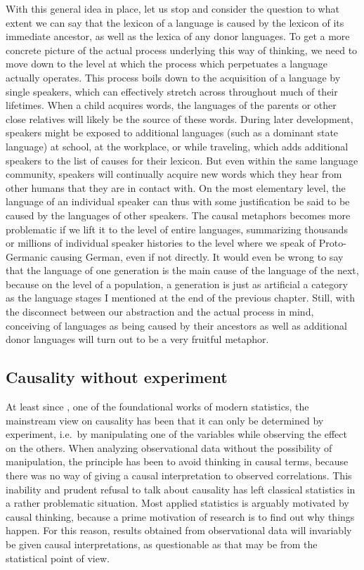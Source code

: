 With this general idea in place, let us stop and consider the question to what extent we can say that the lexicon of a language is caused by the lexicon of its immediate ancestor, as well as the lexica of any donor languages. To get a more concrete picture of the actual process underlying this way of thinking, we need to move down to the level at which the process which perpetuates a language actually operates. This process boils down to the acquisition of a language by single speakers, which can effectively stretch across throughout much of their lifetimes. When a child acquires words, the languages of the parents or other close relatives will likely be the source of these words. During later development, speakers might be exposed to additional languages (such as a dominant state language) at school, at the workplace, or while traveling, which adds additional speakers to the list of causes for their lexicon. But even within the same language community, speakers will continually acquire new words which they hear 
from other humans that they are in contact with. On the most elementary level, the language of an individual speaker can thus with some justification be said to be caused by the languages of other speakers. The causal metaphors becomes more problematic if we lift it to the level of entire languages, summarizing thousands or millions of individual speaker histories to the level where we speak of Proto-Germanic causing German, even if not directly. It would even be wrong to say that the language of one generation is the main cause of the language of the next, because on the level of a population, a generation is just as artificial a category as the language stages I mentioned at the end of the previous chapter. Still, with the disconnect between our abstraction and the actual process in mind, conceiving of languages as being caused by their ancestors as well as additional donor languages will turn out to be a very fruitful metaphor.

\subsection{Causality without experiment}
At least since \cite{fisher1925}, one of the foundational works of modern statistics, the mainstream view on causality has been that it can only be determined by experiment, i.e.\ by manipulating one of the variables while observing the effect on the others. When analyzing observational data without the possibility of manipulation, the principle has been to avoid thinking in causal terms, because there was no way of giving a causal interpretation to observed correlations. This inability and prudent refusal to talk about causality has left classical statistics in a rather problematic situation. Most applied statistics is arguably motivated by causal thinking, because a prime motivation of research is to find out why things happen. For this reason, results obtained from observational data will invariably be given causal interpretations, as questionable as that may be from the statistical point of view.

